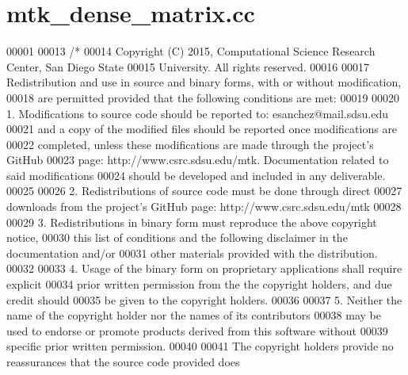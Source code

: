 \hypertarget{mtk__dense__matrix_8cc_source}{\section{mtk\+\_\+dense\+\_\+matrix.\+cc}
\label{mtk__dense__matrix_8cc_source}
}

\begin{DoxyCode}
00001 
00013 \textcolor{comment}{/*}
00014 \textcolor{comment}{Copyright (C) 2015, Computational Science Research Center, San Diego State}
00015 \textcolor{comment}{University. All rights reserved.}
00016 \textcolor{comment}{}
00017 \textcolor{comment}{Redistribution and use in source and binary forms, with or without modification,}
00018 \textcolor{comment}{are permitted provided that the following conditions are met:}
00019 \textcolor{comment}{}
00020 \textcolor{comment}{1. Modifications to source code should be reported to: esanchez@mail.sdsu.edu}
00021 \textcolor{comment}{and a copy of the modified files should be reported once modifications are}
00022 \textcolor{comment}{completed, unless these modifications are made through the project's GitHub}
00023 \textcolor{comment}{page: http://www.csrc.sdsu.edu/mtk. Documentation related to said modifications}
00024 \textcolor{comment}{should be developed and included in any deliverable.}
00025 \textcolor{comment}{}
00026 \textcolor{comment}{2. Redistributions of source code must be done through direct}
00027 \textcolor{comment}{downloads from the project's GitHub page: http://www.csrc.sdsu.edu/mtk}
00028 \textcolor{comment}{}
00029 \textcolor{comment}{3. Redistributions in binary form must reproduce the above copyright notice,}
00030 \textcolor{comment}{this list of conditions and the following disclaimer in the documentation and/or}
00031 \textcolor{comment}{other materials provided with the distribution.}
00032 \textcolor{comment}{}
00033 \textcolor{comment}{4. Usage of the binary form on proprietary applications shall require explicit}
00034 \textcolor{comment}{prior written permission from the the copyright holders, and due credit should}
00035 \textcolor{comment}{be given to the copyright holders.}
00036 \textcolor{comment}{}
00037 \textcolor{comment}{5. Neither the name of the copyright holder nor the names of its contributors}
00038 \textcolor{comment}{may be used to endorse or promote products derived from this software without}
00039 \textcolor{comment}{specific prior written permission.}
00040 \textcolor{comment}{}
00041 \textcolor{comment}{The copyright holders provide no reassurances that the source code provided does}

\end{DoxyCode}
